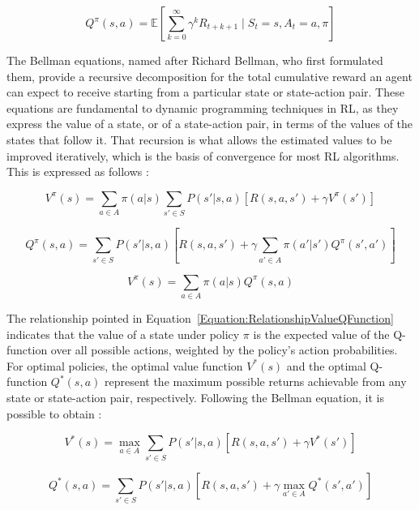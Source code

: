 \begin{equation}
Q^\pi(s, a) = \mathbb{E} \left[ \sum_{k=0}^{\infty} \gamma^k R_{t+k+1} \mid S_t = s, A_t = a, \pi \right]
\end{equation}

The Bellman equations, named after Richard Bellman, who first formulated them, provide a recursive decomposition for the total cumulative reward an agent can expect to receive starting from a particular state or state-action pair. These equations are fundamental to dynamic programming techniques in RL, as they express the value of a state, or of a state-action pair, in terms of the values of the states that follow it. That recursion is what allows the estimated values to be improved iteratively, which is the basis of convergence for most RL algorithms. This is expressed as follows \cite{sutton_reinforcement_2018}:

\begin{equation}
V^\pi(s) = \sum_{a \in A} \pi(a|s) \sum_{s' \in S} P(s'|s,a) \left[ R(s,a,s') + \gamma V^\pi(s') \right]
\end{equation}

\begin{equation}
Q^\pi(s, a) = \sum_{s' \in S} P(s'|s,a) \left[ R(s,a,s') + \gamma \sum_{a' \in A} \pi(a'|s') Q^\pi(s', a') \right]
\end{equation}

\begin{equation}
\label{Equation:RelationshipValueQFunction}
V^\pi(s) = \sum_{a \in A} \pi(a|s) Q^\pi(s, a)
\end{equation}

The relationship pointed in Equation~\ref{Equation:RelationshipValueQFunction} indicates that the value of a state under policy \(\pi\) is the expected value of the Q-function over all possible actions, weighted by the policy's action probabilities. For optimal policies, the optimal value function \( V^*(s) \) and the optimal Q-function \( Q^*(s, a) \) represent the maximum possible returns achievable from any state or state-action pair, respectively. Following the Bellman equation, it is possible to obtain \cite{sutton_reinforcement_2018}:

\begin{equation}
V^*(s) = \max_{a \in A} \sum_{s' \in S} P(s'|s,a) \left[ R(s,a,s') + \gamma V^*(s') \right]
\end{equation}

\begin{equation}
Q^*(s, a) = \sum_{s' \in S} P(s'|s,a) \left[ R(s,a,s') + \gamma \max_{a' \in A} Q^*(s', a') \right]
\end{equation}

